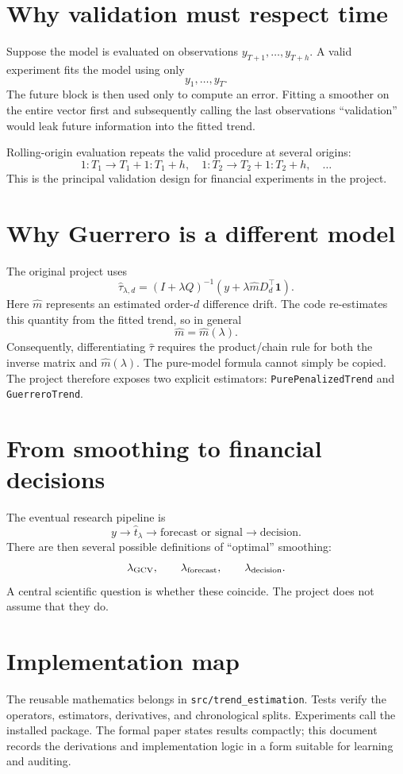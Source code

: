 \documentclass[11pt]{article}
\begin{document}
\section{Why validation must respect time}
Suppose the model is evaluated on observations $y_{T+1},\ldots,y_{T+h}$. A
valid experiment fits the model using only
\[
y_1,\ldots,y_T.
\]
The future block is then used only to compute an error. Fitting a smoother on
the entire vector first and subsequently calling the last observations
``validation'' would leak future information into the fitted trend.

Rolling-origin evaluation repeats the valid procedure at several origins:
\[
1{:}T_1\rightarrow T_1{+}1{:}T_1{+}h,
\quad
1{:}T_2\rightarrow T_2{+}1{:}T_2{+}h,
\quad\ldots
\]
This is the principal validation design for financial experiments in the
project.

\section{Why Guerrero is a different model}
The original project uses
\begin{equation}
\widehat\tau_{\lambda,d}
=(I+\lambda Q)^{-1}
\left(y+\lambda\widehat mD_d^\top\mathbf1\right).
\end{equation}
Here $\widehat m$ represents an estimated order-$d$ difference drift. The code
re-estimates this quantity from the fitted trend, so in general
\[
\widehat m=\widehat m(\lambda).
\]
Consequently, differentiating $\widehat\tau$ requires the product/chain rule
for both the inverse matrix and $\widehat m(\lambda)$. The pure-model formula
cannot simply be copied. The project therefore exposes two explicit estimators:
\texttt{PurePenalizedTrend} and \texttt{GuerreroTrend}.

\section{From smoothing to financial decisions}
The eventual research pipeline is
\[
y\longrightarrow \widehat t_\lambda
\longrightarrow \text{forecast or signal}
\longrightarrow \text{decision}.
\]
There are then several possible definitions of ``optimal'' smoothing:
\[
\lambda_{\rm GCV},\qquad
\lambda_{\rm forecast},\qquad
\lambda_{\rm decision}.
\]
A central scientific question is whether these coincide. The project does not
assume that they do.

\section{Implementation map}
The reusable mathematics belongs in \texttt{src/trend\_estimation}. Tests
verify the operators, estimators, derivatives, and chronological splits.
Experiments call the installed package. The formal paper states results
compactly; this document records the derivations and implementation logic in a
form suitable for learning and auditing.
\end{document}
